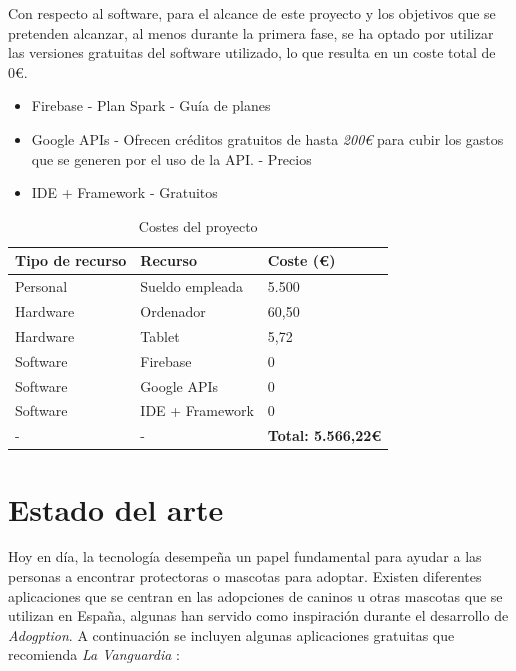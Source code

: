 \documentclass[a4paper, 12pt]{article}
\begin{document}
Con respecto al software, para el alcance de este proyecto y los objetivos que se pretenden alcanzar, al menos durante la primera fase, se ha optado por utilizar las versiones gratuitas del software utilizado, lo que resulta en un coste total de 0€.

\begin{itemize}[noitemsep]
	\item Firebase - Plan Spark - Guía de planes \cite{firebase_plans}
	\item Google APIs - Ofrecen créditos gratuitos de hasta \textit{200€} para cubir los gastos que se generen por el uso de la API. - Precios \cite{google_prices}
	\item IDE + Framework - Gratuitos
\end{itemize}


\begin{table}[H]
    \centering
    \begin{tabular}{ | m{5cm} | m{5cm} | m{5cm} | }
	    \hline \textbf{Tipo de recurso} & \textbf{Recurso} & \textbf{Coste (€)} \\ \hline
	    	Personal & Sueldo empleada & 5.500 \\ \hline
		Hardware & Ordenador & 60,50 \\ \hline
		Hardware & Tablet & 5,72 \\ \hline
	    	Software & Firebase & 0 \\ \hline
		Software & Google APIs & 0 \\ \hline
		Software & IDE + Framework & 0 \\ \hline
	   	- & -  & \textbf{Total: 5.566,22€} \\ \hline
    \end{tabular}
    \caption{Costes del proyecto}
    \label{tab:costes}
\end{table}

\newpage
\section{Estado del arte}

Hoy en día, la tecnología desempeña un papel fundamental para ayudar a las personas a encontrar protectoras o mascotas para adoptar. Existen diferentes aplicaciones que se centran en las adopciones de caninos u otras mascotas que se utilizan en España, algunas han servido como inspiración durante el desarrollo de \textit{Adogption}. A continuación se incluyen algunas aplicaciones gratuitas que recomienda \textit{La Vanguardia} \cite{lavanguardia}: 
\end{document}
